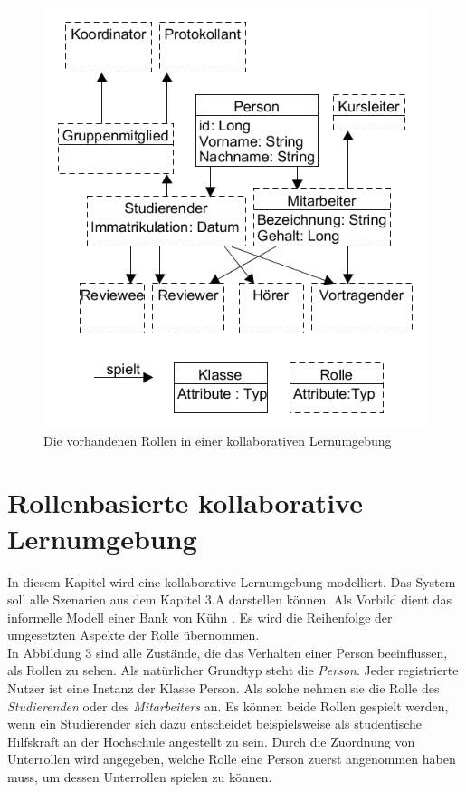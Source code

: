 \documentclass[conference]{IEEEtran}
\begin{document}
\begin{figure}
\centering
\includegraphics[scale=0.4]{Images/collabLearningBehavorial.PNG}
\caption{Die vorhandenen Rollen in einer kollaborativen Lernumgebung}
\end{figure}
\section{Rollenbasierte kollaborative Lernumgebung}
In diesem Kapitel wird eine kollaborative Lernumgebung modelliert. Das System soll alle Szenarien aus dem Kapitel 3.A  darstellen können. Als Vorbild dient das informelle Modell einer Bank von Kühn \cite{family}. Es wird die Reihenfolge der umgesetzten Aspekte der Rolle übernommen. \\In Abbildung 3 sind alle Zustände, die das Verhalten einer Person beeinflussen, als Rollen zu sehen. Als natürlicher Grundtyp steht die \textit{Person}. Jeder registrierte Nutzer ist eine Instanz der Klasse Person. Als solche nehmen sie die Rolle des \textit{Studierenden} oder des \textit{Mitarbeiters} an. Es können beide Rollen gespielt werden, wenn ein Studierender sich dazu entscheidet beispielsweise als studentische Hilfskraft an der Hochschule angestellt zu sein. Durch die Zuordnung von Unterrollen wird angegeben, welche Rolle eine Person zuerst angenommen haben muss, um dessen Unterrollen spielen zu können. \\ 
\end{document}
